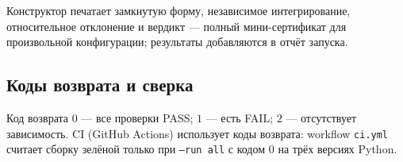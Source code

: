 Конструктор печатает замкнутую форму, независимое интегрирование,
относительное отклонение и вердикт --- полный мини-сертификат
для произвольной конфигурации; результаты добавляются в отчёт
запуска.

\subsection{Коды возврата и сверка}

Код возврата $0$ --- все проверки PASS; $1$ --- есть FAIL;
$2$ --- отсутствует зависимость. CI (GitHub Actions) использует
коды возврата: workflow \texttt{ci.yml} считает сборку зелёной
только при \texttt{--run all} с кодом $0$ на трёх версиях Python.
